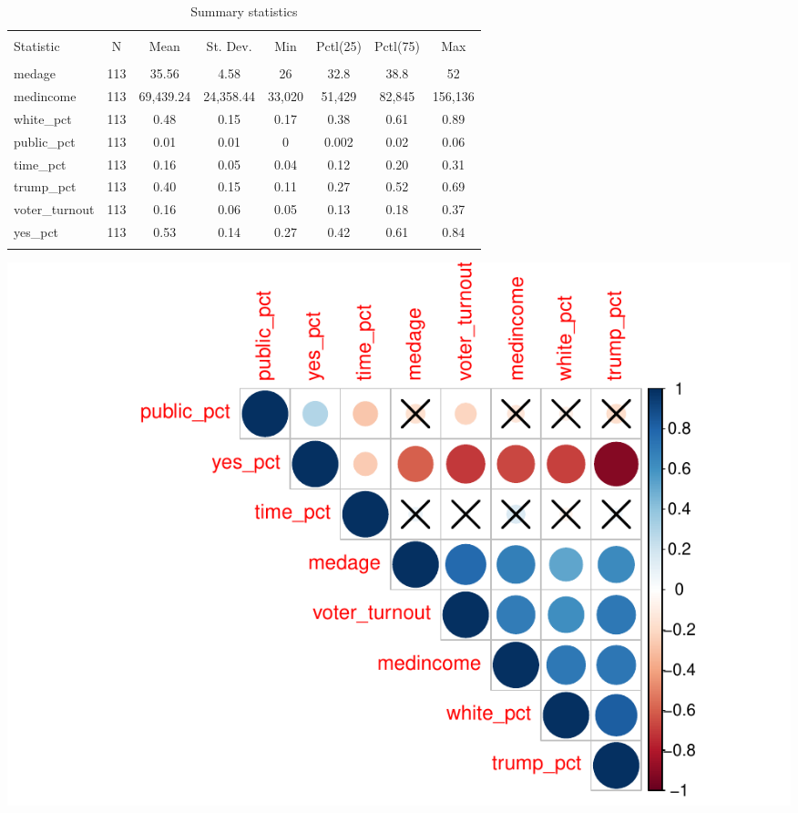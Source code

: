 \documentclass[
]{article}
\begin{document}
\begin{table}[!htbp] \centering 
  \caption{Summary statistics} 
  \label{summaryStats} 
\begin{tabular}{@{\extracolsep{5pt}}lccccccc} 
\\[-1.8ex]\hline 
\hline \\[-1.8ex] 
Statistic & \multicolumn{1}{c}{N} & \multicolumn{1}{c}{Mean} & \multicolumn{1}{c}{St. Dev.} & \multicolumn{1}{c}{Min} & \multicolumn{1}{c}{Pctl(25)} & \multicolumn{1}{c}{Pctl(75)} & \multicolumn{1}{c}{Max} \\ 
\hline \\[-1.8ex] 
medage & 113 & 35.56 & 4.58 & 26 & 32.8 & 38.8 & 52 \\ 
medincome & 113 & 69,439.24 & 24,358.44 & 33,020 & 51,429 & 82,845 & 156,136 \\ 
white\_pct & 113 & 0.48 & 0.15 & 0.17 & 0.38 & 0.61 & 0.89 \\ 
public\_pct & 113 & 0.01 & 0.01 & 0 & 0.002 & 0.02 & 0.06 \\ 
time\_pct & 113 & 0.16 & 0.05 & 0.04 & 0.12 & 0.20 & 0.31 \\ 
trump\_pct & 113 & 0.40 & 0.15 & 0.11 & 0.27 & 0.52 & 0.69 \\ 
voter\_turnout & 113 & 0.16 & 0.06 & 0.05 & 0.13 & 0.18 & 0.37 \\ 
yes\_pct & 113 & 0.53 & 0.14 & 0.27 & 0.42 & 0.61 & 0.84 \\ 
\hline \\[-1.8ex] 
\end{tabular} 
\end{table}

\includegraphics{Zhong_paper_files/figure-latex/create correlation matrix-1.pdf}
\end{document}
